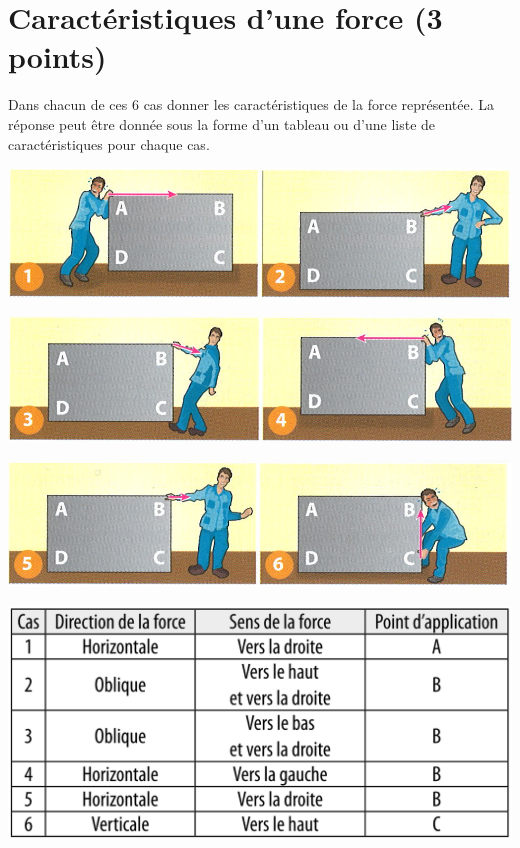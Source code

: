 \section{Caractéristiques d'une force (3 points)}\label{force}

Dans chacun de ces 6 cas donner les caractéristiques de la force représentée. %
La réponse peut être donnée sous la forme d'un tableau ou d'une liste de caractéristiques pour chaque cas.

\begin{center}
	\includegraphics[scale=0.5]{forces_1}
	
	\vspace*{0.5cm}
	
	\includegraphics[scale=0.5]{forces_2}

	\vspace*{0.5cm}
	
	\includegraphics[scale=0.5]{forces3}
	
	\begin{solution}
		\includegraphics[scale=0.5]{carac_forces}
	\end{solution}
\end{center}
